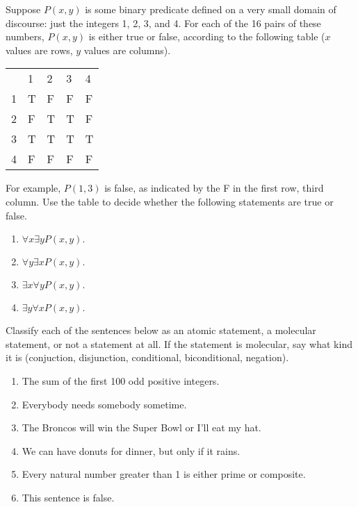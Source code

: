 \documentclass[11pt,]{book}
\theoremstyle{ptxplainnotitle}
\theoremstyle{ptxplaintitle}
\theoremstyle{ptxdefinitionnotitle}
\theoremstyle{ptxdefinitiontitle}
\theoremstyle{ptxdefinitionnotitle}
\theoremstyle{ptxdefinitiontitle}
\theoremstyle{ptxdefinitionnotitle}
\theoremstyle{ptxdefinitiontitle}
\theoremstyle{ptxdefinitiontitlenonumber}
\theoremstyle{ptxdefinitiontitlenonumber}
\numberwithin{equation}{chapter}
\begin{document}
\begin{divisionexercise}{10}\hypertarget{exercise-158}{}
\hypertarget{p-2243}{}%
Suppose \(P(x,y)\) is some binary predicate defined on a very small domain of discourse: just the integers 1, 2, 3, and 4.  For each of the 16 pairs of these numbers, \(P(x,y)\) is either true or false, according to the following table (\(x\) values are rows, \(y\) values are columns).%
\begin{sidebyside}{1}{0}{0}{0}
\begin{sbspanel}{1}
{\centering%
\begin{tabular}{lllll}
&1&2&3&4\tabularnewline[0pt]
1&T&F&F&F\tabularnewline[0pt]
2&F&T&T&F\tabularnewline[0pt]
3&T&T&T&T\tabularnewline[0pt]
4&F&F&F&F
\end{tabular}
\par}
\end{sbspanel}
\end{sidebyside}
\par
\hypertarget{p-2244}{}%
For example, \(P(1,3)\) is false, as indicated by the F in the first row, third column.  Use the table to decide whether the following statements are true or false. \leavevmode%
\begin{enumerate}[label=\alph*.]
\item\hypertarget{li-1117}{}\hypertarget{p-2245}{}%
\(\forall x \exists y P(x,y)\text{.}\) %
\item\hypertarget{li-1122}{}\hypertarget{p-2250}{}%
\(\forall y \exists x P(x,y)\text{.}\) %
\item\hypertarget{li-1127}{}\hypertarget{p-2255}{}%
\(\exists x \forall y P(x,y)\text{.}\) %
\item\hypertarget{li-1132}{}\hypertarget{p-2260}{}%
\(\exists y \forall x P(x,y)\text{.}\) %
\end{enumerate}
%
\end{divisionexercise}%
\begin{divisionexercise}{11}\hypertarget{exercise-159}{}
\hypertarget{p-2270}{}%
Classify each of the sentences below as an atomic statement, a molecular statement, or not a statement at all.  If the statement is molecular, say what kind it is (conjuction, disjunction, conditional, biconditional, negation). \leavevmode%
\begin{enumerate}[label=(\alph*)]
\item\hypertarget{li-1141}{}The sum of the first 100 odd positive integers.%
\item\hypertarget{li-1142}{}Everybody needs somebody sometime.%
\item\hypertarget{li-1143}{}The Broncos will win the Super Bowl or I'll eat my hat.%
\item\hypertarget{li-1144}{}We can have donuts for dinner, but only if it rains.%
\item\hypertarget{li-1145}{}Every natural number greater than 1 is either prime or composite.%
\item\hypertarget{li-1146}{}This sentence is false.%
\end{enumerate}
%
\end{divisionexercise}%
\end{document}
